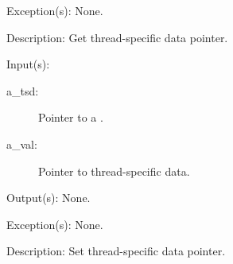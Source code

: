 \begin{capi}
\begin{capilist}
	\item[Exception(s): ] None.
	\item[Description: ]
		Get thread-specific data pointer.
	\end{capilist}
\label{tsd_set}
	\begin{capilist}
	\item[Input(s): ]
		\begin{description}\item[]
		\item[a\_tsd: ]
			Pointer to a .
		\item[a\_val: ]
			Pointer to thread-specific data.
		\end{description}
	\item[Output(s): ] None.
	\item[Exception(s): ] None.
	\item[Description: ]
		Set thread-specific data pointer.
	\end{capilist}
\end{capi}
